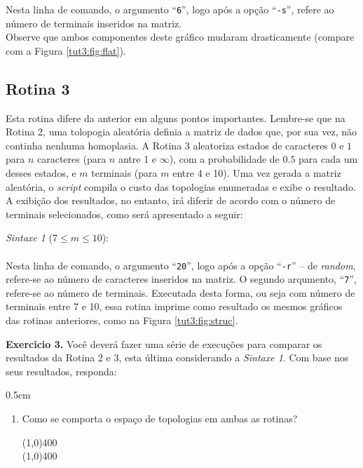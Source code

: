 \begin{refsection}
Nesta linha de comando, o argumento ``\texttt{6}'', logo após a opção ``\texttt{-s}'', refere ao número de terminais inseridos na matriz.\\

	Observe que ambos componentes deste gráfico mudaram drasticamente (compare com a Figura \ref{tut3:fig:flat}). 


\subsection{Rotina 3}\label{tut3:subs:rand}

	Esta rotina difere da anterior em alguns pontos importantes. Lembre-se que na Rotina 2, uma tolopogia aleatória definia a matriz de dados que, por sua vez, não continha nenhuma homoplasia. A Rotina 3 aleatoriza estados de caracteres $0$ e $1$ para $n$ caracteres (para $n$ antre 1 e $\infty$), com a probabilidade de $0.5$ para cada um desses estados, e $m$ terminais (para $m$ entre 4 e 10). Uma vez gerada a matriz aleatória, o \textit{script} compila o custo das topologias enumeradas e exibe o resultado. A exibição dos resultados, no entanto, irá diferir de acordo com o número de terminais selecionados, como será apresentado a seguir:



\indent\textit{Sintaxe 1} ($7 \leq m \leq 10$): \\
\indent\indent\indent{}\\

Nesta linha de comando, o argumento ``\texttt{20}'', logo após a opção ``\texttt{-r}'' -- de \textit{random}, refere-se ao número de caracteres inseridos na matriz. O segundo arqumento, ``\texttt{7}'', refere-se ao número de terminais. Executada desta forma, ou seja com número de terminais entre 7 e 10, essa rotina imprime como resultado os mesmos gráficos das rotinas anteriores, como na Figura \ref{tut3:fig:struc}. 


\begin{blackBlock}{\textbf{Exercicio 3.}}\label{tut3:ex:3.\arabic{ex}}
	Você deverá fazer uma série de execuções para comparar os resultados da Rotina 2 e 3, esta última considerando a \textit{Sintaxe 1}. Com base nos seus resultados, responda:
\begin {myindentpar}{0.5cm}
\begin{enumerate}[\itshape i.]
 \item{Como se comporta o espaço de topologias em ambas as rotinas?}\label{tut3:ex3}\\
  \begin{center}
  \line(1,0){400}\\
  \line(1,0){400}\\
  \end{center}


\end{enumerate}
\end{myindentpar}
\end{blackBlock}
\end{refsection}
